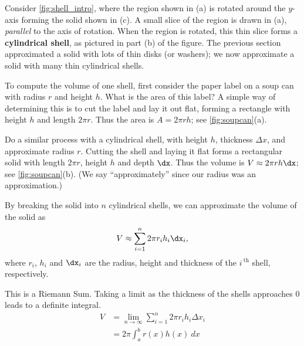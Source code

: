 Consider \autoref{fig:shell_intro}, where the region shown in (a) is rotated around the $y$-axis forming the solid shown in (c). A small slice of the region is drawn in (a), \emph{parallel} to the axis of rotation. When the region is rotated, this thin slice forms a \textbf{cylindrical shell}, as pictured in part (b) of the figure. The previous section approximated a solid with lots of thin disks (or washers); we now approximate a solid with many thin cylindrical shells.

To compute the volume of one shell, first consider the paper label on a soup can with radius $r$ and height $h$. What is the area of this label? A simple way of determining this is to cut the label and lay it out flat, forming a rectangle with height $h$ and length $2\pi r$. Thus the area is $A = 2\pi rh$; see \autoref{fig:soupcan}(a).

Do a similar process with a cylindrical shell, with height $h$, thickness $\Delta x$, and approximate radius $r$. Cutting the shell and laying it flat forms a rectangular solid with length $2\pi r$, height $h$ and depth $\dx$. Thus the volume is $V \approx 2\pi rh\dx$; see \autoref{fig:soupcan}(b). (We say ``approximately'' since our radius was an approximation.)

By breaking the solid into $n$ cylindrical shells, we can approximate the volume of the solid as
$$V \approx \sum_{i=1}^n 2\pi r_ih_i\dx_i,$$ where $r_i$, $h_i$ and $\dx_i$ are the radius, height and thickness of the $i\,^\text{th}$ shell, respectively. 

This is a Riemann Sum. Taking a limit as the thickness of the shells approaches 0 leads to a definite integral.
\begin{align*}
V&=\lim_{n\to \infty} \sum_{i=1}^n 2\pi r_i h_i \Delta x_i\\
&=2\pi \int_a^b r(x)h(x)~dx
\end{align*}

